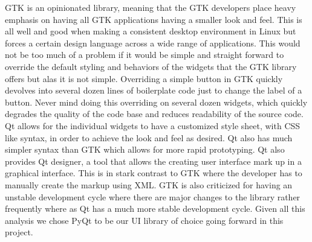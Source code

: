 GTK is an opinionated library, meaning that the GTK developers place heavy emphasis on having all GTK applications having a smaller look and feel. This is all well and good when making a consistent desktop environment in Linux but forces a certain design language across a wide range of applications. This would not be too much of a problem if it would be simple and straight forward to override the default styling and behaviors of the widgets that the GTK library offers but alas it is not simple. Overriding a simple button in GTK quickly devolves into several dozen lines of boilerplate code just to change the label of a button. Never mind doing this overriding on several dozen widgets, which quickly degrades the quality of the code base and reduces readability of the source code.\\
Qt allows for the individual widgets to have a customized style sheet, with CSS like syntax, in order to achieve the look and feel as desired. Qt also has much simpler syntax than GTK which allows for more rapid prototyping. Qt also provides Qt designer, a tool that allows the creating user interface mark up in a graphical interface. This is in stark contrast to GTK where the developer has to manually create the markup using XML. GTK is also criticized for having an unstable development cycle where there are major changes to the library rather frequently where as Qt has a much more stable development cycle. Given all this analysis we chose PyQt to be our UI library of choice going forward in this project.\\
